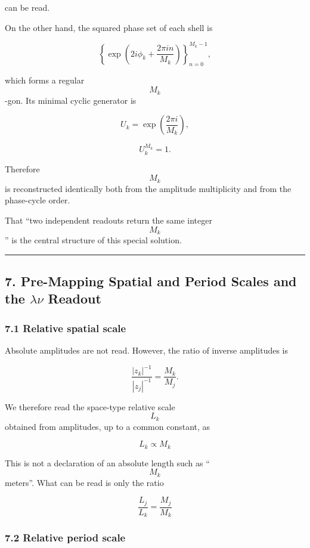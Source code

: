 \documentclass[
  a4paper,
]{article}
\begin{document}
can be read.

On the other hand, the squared phase set of each shell is

\[
\left\{
\exp\left(2i\phi_k+\frac{2\pi i n}{M_k}\right)
\right\}_{n=0}^{M_k-1},
\]

which forms a regular \[M_k\]-gon. Its minimal cyclic generator is

\[
U_k
=
\exp\left(\frac{2\pi i}{M_k}\right),
\]

\[
U_k^{M_k}=1.
\tag{23}
\]

Therefore \[M_k\] is reconstructed identically both from the amplitude
multiplicity and from the phase-cycle order.

That ``two independent readouts return the same integer \[M_k\]'' is the
central structure of this special solution.

\begin{center}\rule{0.5\linewidth}{0.5pt}\end{center}

\subsection{\texorpdfstring{7. Pre-Mapping Spatial and Period Scales and
the \(\lambda\nu\)
Readout}{7. Pre-Mapping Spatial and Period Scales and the \textbackslash lambda\textbackslash nu Readout}}\label{pre-mapping-spatial-and-period-scales-and-the-lambdanu-readout}

\subsubsection{7.1 Relative spatial scale}\label{relative-spatial-scale}

Absolute amplitudes are not read. However, the ratio of inverse
amplitudes is

\[
\frac{|z_k|^{-1}}{|z_j|^{-1}}
=
\frac{M_k}{M_j}.
\]

We therefore read the space-type relative scale \[L_k\] obtained from
amplitudes, up to a common constant, as

\[
\boxed{
L_k\propto M_k
}
\tag{24}
\]

This is not a declaration of an absolute length such as ``\[M_k\]
meters''. What can be read is only the ratio

\[
\boxed{
\frac{L_j}{L_k}=\frac{M_j}{M_k}
}
\tag{25}
\]

\subsubsection{7.2 Relative period scale}\label{relative-period-scale}
\end{document}
